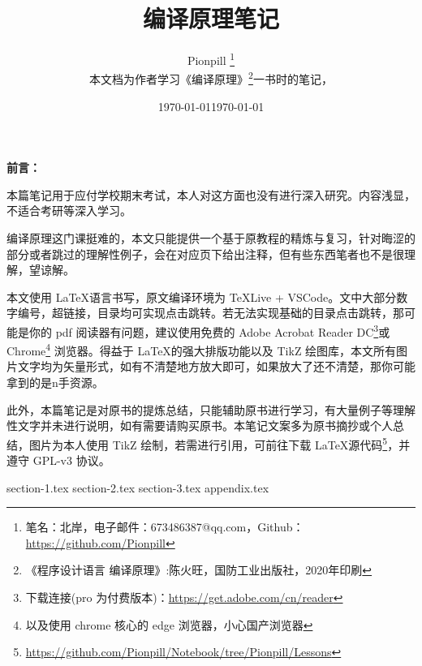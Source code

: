 \documentclass{PionpillNote-art}
\title{编译原理笔记}
\author{
    Pionpill \footnote{笔名：北岸，电子邮件：673486387@qq.com，Github：\url{https://github.com/Pionpill}} \\
    本文档为作者学习《编译原理》\footnote{《程序设计语言 编译原理》:陈火旺，国防工业出版社，2020年印刷}一书时的笔记，\\
}
\date{\today}
\begin{document}
\maketitle

\noindent\textbf{前言：}

本篇笔记用于应付学校期末考试，本人对这方面也没有进行深入研究。内容浅显，不适合考研等深入学习。

编译原理这门课挺难的，本文只能提供一个基于原教程的精炼与复习，针对晦涩的部分或者跳过的理解性例子，会在对应页下给出注释，但有些东西笔者也不是很理解，望谅解。

本文使用 \LaTeX 语言书写，原文编译环境为 TeXLive + VSCode。文中大部分数字编号，超链接，目录均可实现点击跳转。若无法实现基础的目录点击跳转，那可能是你的 pdf 阅读器有问题，建议使用免费的 Adobe Acrobat Reader DC\footnote{下载连接(pro 为付费版本)：\url{https://get.adobe.com/cn/reader}}或 Chrome\footnote{以及使用 chrome 核心的 edge 浏览器，小心国产浏览器} 浏览器。得益于 \LaTeX 的强大排版功能以及 TikZ 绘图库，本文所有图片文字均为矢量形式，如有不清楚地方放大即可，如果放大了还不清楚，那你可能拿到的是n手资源。

此外，本篇笔记是对原书的提炼总结，只能辅助原书进行学习，有大量例子等理解性文字并未进行说明，如有需要请购买原书。本笔记文案多为原书摘抄或个人总结，图片为本人使用 TikZ 绘制，若需进行引用，可前往下载 \LaTeX 源代码\footnote{\url{https://github.com/Pionpill/Notebook/tree/Pionpill/Lessons}}，并遵守 GPL-v3 协议。

\date{\today}

\newpage

\tableofcontents
\thispagestyle{empty}
\newpage
\setcounter{page}{1} 

{section-1.tex}
{section-2.tex}
{section-3.tex}
{appendix.tex}
\end{document}

